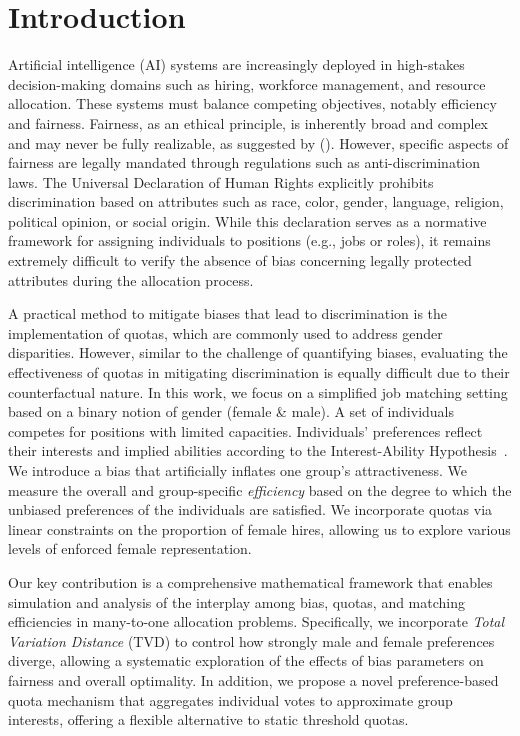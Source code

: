 \documentclass[letterpaper]{article}
\newcommand{\citet}[1]{\citeauthor{#1} (\citeyear{#1})}
\begin{document}
\section{Introduction}
Artificial intelligence (AI) systems are increasingly deployed in high-stakes decision-making domains such as hiring, workforce management, and resource allocation. These systems must balance competing objectives, notably efficiency and fairness. Fairness, as an ethical principle, is inherently broad and complex and may never be fully realizable, as suggested by \citet{Peterson_Hamrouni_2022}. However, specific aspects of fairness are legally mandated through regulations such as anti-discrimination laws. The Universal Declaration of Human Rights \cite{udhr1948} explicitly prohibits discrimination based on attributes such as race, color, gender, language, religion, political opinion, or social origin. While this declaration serves as a normative framework for assigning individuals to positions (e.g., jobs or roles), it remains extremely difficult to verify the absence of bias concerning legally protected attributes during the allocation process.

A practical method to mitigate biases that lead to discrimination is the implementation of quotas, which are commonly used to address gender disparities. However, similar to the challenge of quantifying biases, evaluating the effectiveness of quotas in mitigating discrimination is equally difficult due to their counterfactual nature. In this work, we focus on a simplified job matching setting based on a binary notion of gender (female \& male). A set of individuals competes for positions with limited capacities. Individuals' preferences reflect their interests and implied abilities according to the Interest-Ability Hypothesis~\cite{jintelligence10030043}. We introduce a bias that artificially inflates one group's attractiveness. We measure the overall and group-specific \textit{efficiency} based on the degree to which the unbiased preferences of the individuals are satisfied. We incorporate quotas via linear constraints on the proportion of female hires, allowing us to explore various levels of enforced female representation. 

Our key contribution is a comprehensive mathematical framework that enables simulation and analysis of the interplay among bias, quotas, and matching efficiencies in many-to-one allocation problems. Specifically, we incorporate \textit{Total Variation Distance} (TVD) to control how strongly male and female preferences diverge, allowing a systematic exploration of the effects of bias parameters on fairness and overall optimality. In addition, we propose a novel preference-based quota mechanism that aggregates individual votes to approximate group interests, offering a flexible alternative to static threshold quotas.
\end{document}

